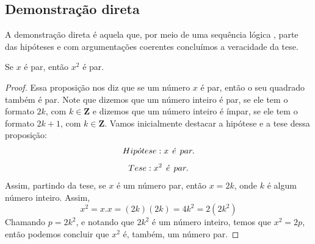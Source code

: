 \subsection{Demonstração direta}
A demonstração direta é aquela que, por meio de uma sequência lógica , parte das hipóteses e com argumentações coerentes concluímos a veracidade da tese.
\begin{prop} \label{par}
Se $x$ é par, então $x^2$ é par.
\end{prop}
\begin{proof}
Essa proposição nos diz que se um número $x$ é par, então o seu quadrado também é par. Note que dizemos que um número inteiro é par, se ele tem o formato $2k$, com $k \in \mathbf{Z}$ e dizemos que um número inteiro é ímpar, se ele tem o formato $2k+1$, com $k \in \mathbf{Z}$.
Vamos inicialmente destacar a hipótese e a tese dessa proposição:
$$Hip\acute{o}tese: x \hspace{0.15cm}  \acute{e} \hspace{0.15cm} par.$$
$$Tese: x^2 \hspace{0.15cm}  \acute{e} \hspace{0.15cm} par.$$
Assim, partindo da tese, se $x$ é um número par, então $x=2k$, onde $k$ é algum número inteiro. Assim,
$$x^2= x.x= (2k)(2k)= 4k^2=2(2k^2)$$
Chamando $p=2k^2$, e notando que $2k^2$ é um número inteiro, temos que $x^2=2p$, então podemos concluir que $x^2$ é, também, um número par.
\end{proof}

